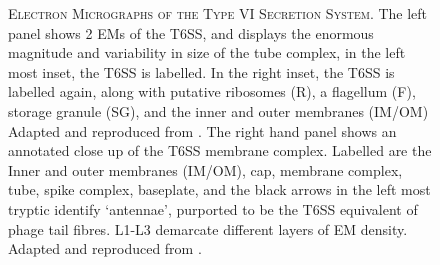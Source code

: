 \vspace{0.1cm}
\begin{figure}[h]
\centering
    \begin{subfigure}[b]{0.481\textwidth}
        \centering
        {%
\setlength{\fboxsep}{0pt}%
\setlength{\fboxrule}{1pt}%
            }%
    \end{subfigure}%
    \begin{subfigure}[t]{0.499\textwidth}
        \centering
        {%
\setlength{\fboxsep}{0pt}%
\setlength{\fboxrule}{1pt}%
        }%
        \end{subfigure}%
	\captionsetup{singlelinecheck=off, justification=justified, font=footnotesize, aboveskip=10pt}
	\caption[Electron micrographs of the Type VI Secretion System]{\textsc{\normalsize Electron Micrographs of the Type VI Secretion System.}\vspace{0.1cm} \newline The left panel shows 2 EMs of the T6SS, and displays the enormous magnitude and variability in size of the tube complex, in the left most inset, the T6SS is labelled. In the right inset, the T6SS is labelled again, along with putative ribosomes (R), a flagellum (F), storage granule (SG), and the inner and outer membranes (IM/OM) Adapted and reproduced from \cite{Basler2012}. The right hand panel shows an annotated close up of the T6SS membrane complex. Labelled are the Inner and outer membranes (IM/OM), cap, membrane complex, tube, spike complex, baseplate, and the black arrows in the left most tryptic identify `antennae', purported to be the T6SS equivalent of phage tail fibres. L1-L3 demarcate different layers of EM density. Adapted and reproduced from \cite{Chang2017}.}
	\label{t6ssEMs}
\end{figure}


